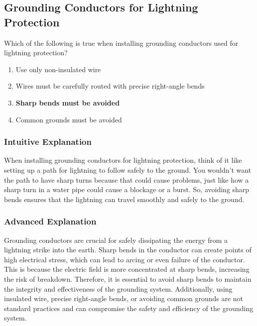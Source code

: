 \subsection{Grounding Conductors for Lightning Protection}
\label{T0B10}

\begin{tcolorbox}[colback=gray!10!white,colframe=black!75!black,title=T0B10]
Which of the following is true when installing grounding conductors used for lightning protection?
\begin{enumerate}[noitemsep]
    \item Use only non-insulated wire
    \item Wires must be carefully routed with precise right-angle bends
    \item \textbf{Sharp bends must be avoided}
    \item Common grounds must be avoided
\end{enumerate}
\end{tcolorbox}

\subsubsection*{Intuitive Explanation}
When installing grounding conductors for lightning protection, think of it like setting up a path for lightning to follow safely to the ground. You wouldn't want the path to have sharp turns because that could cause problems, just like how a sharp turn in a water pipe could cause a blockage or a burst. So, avoiding sharp bends ensures that the lightning can travel smoothly and safely to the ground.

\subsubsection*{Advanced Explanation}
Grounding conductors are crucial for safely dissipating the energy from a lightning strike into the earth. Sharp bends in the conductor can create points of high electrical stress, which can lead to arcing or even failure of the conductor. This is because the electric field is more concentrated at sharp bends, increasing the risk of breakdown. Therefore, it is essential to avoid sharp bends to maintain the integrity and effectiveness of the grounding system. Additionally, using insulated wire, precise right-angle bends, or avoiding common grounds are not standard practices and can compromise the safety and efficiency of the grounding system.